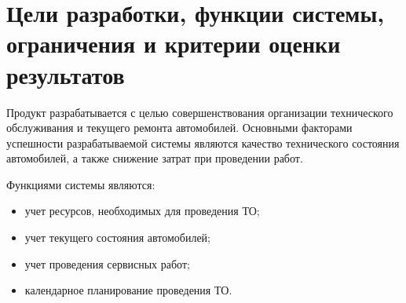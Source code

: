 \section{Цели разработки, функции системы, ограничения и критерии оценки
результатов}

Продукт разрабатывается с целью совершенствования организации технического
обслуживания и текущего ремонта автомобилей. Основными факторами успешности
разрабатываемой системы являются качество технического состояния автомобилей, а
также снижение затрат при проведении работ.

Функциями системы являются:
\begin{itemize}
	\item учет ресурсов, необходимых для проведения ТО;
	\item учет текущего состояния автомобилей;
	\item учет проведения сервисных работ;
	\item календарное планирование проведения ТО.
\end{itemize}
